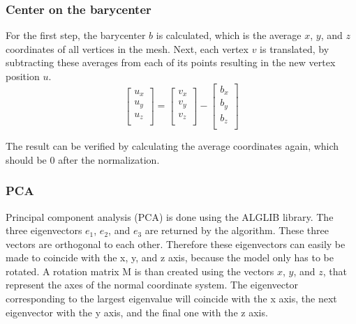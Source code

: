 \documentclass{bigdata}
\begin{document}
\subsubsection{Center on the barycenter}

For the first step, the barycenter $b$ is calculated, which is the average $x$, $y$, and $z$ coordinates of all vertices in the mesh. Next, each vertex $v$ is translated, by subtracting these averages from each of its points resulting in the new vertex position $u$.
\[
\begin{bmatrix}
u_x \\
u_y \\
u_z \\
\end{bmatrix}
=
\begin{bmatrix}
v_x \\
v_y \\
v_z \\
\end{bmatrix}
-
\begin{bmatrix}
b_x \\
b_y \\
b_z \\
\end{bmatrix}
\]

\noindent The result can be verified by calculating the average coordinates again, which should be 0 after the normalization.

\subsubsection{PCA}
Principal component analysis (PCA) is done using the ALGLIB library. The three eigenvectors $e_1$, $e_2$, and $e_3$ are returned by the algorithm. These three vectors are orthogonal to each other. Therefore these eigenvectors can easily be made to coincide with the x, y, and z axis, because the model only has to be rotated. A rotation matrix M is than created using the vectors $x$, $y$, and $z$, that represent the axes of the normal coordinate system. The eigenvector corresponding to the largest eigenvalue will coincide with the x axis, the next eigenvector with the y axis, and the final one with the z axis.
\end{document}
